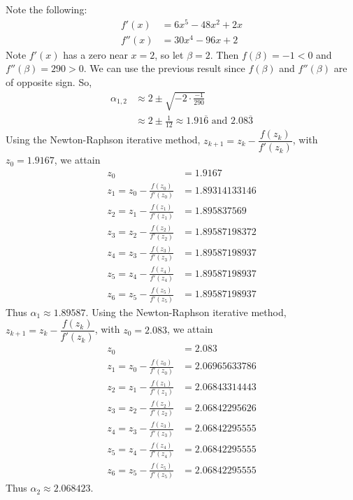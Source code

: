 \documentclass[12pt]{article}
\begin{document}
\noindent Note the following:
\begin{align*}
f'(x) &= 6x^5 - 48x^2 + 2x \\
f''(x) &= 30x^4 - 96x + 2
\end{align*}
Note $f'(x)$ has a zero near $x = 2$, so let $\beta = 2$.  Then $f(\beta) = -1< 0$ and $f''(\beta) = 290 > 0$.  We can use the previous result since $f(\beta)$ and $f''(\beta)$ are of opposite sign.  So,
\begin{align*}
\alpha_{1,2} &\approx 2 \pm \sqrt{-2\cdot \frac{-1}{290}} \\
&\approx 2 \pm \frac{1}{12} \approx 1.91\overline{6} \text{ and } 2.08\overline{3}\end{align*}
Using the Newton-Raphson iterative method, $z_{k+1} = z_k - \dfrac{f(z_k)}{f'(z_k)}$, with $z_0 = 1.9167$, we attain
\begin{align*}
z_0 &= 1.9167 \\
z_1 = z_0 - \frac{f(z_0)}{f'(z_0)} &= 1.89314133146 \\
z_2 = z_1 - \frac{f(z_1)}{f'(z_1)} &=  1.895837569 \\
z_3 = z_2 - \frac{f(z_2)}{f'(z_2)} &=  1.89587198372 \\
z_4 = z_3 - \frac{f(z_3)}{f'(z_3)} &=  1.89587198937 \\
z_5 = z_4 - \frac{f(z_4)}{f'(z_4)} &=  1.89587198937 \\
z_6 = z_5 - \frac{f(z_5)}{f'(z_5)} &=  1.89587198937
\end{align*}
Thus $\alpha_1 \approx 1.89587$.  Using the Newton-Raphson iterative method, $z_{k+1} = z_k - \dfrac{f(z_k)}{f'(z_k)}$, with $z_0 = 2.083$, we attain
\begin{align*}
z_0 &= 2.083 \\
z_1 = z_0 - \frac{f(z_0)}{f'(z_0)} &= 2.06965633786 \\
z_2 = z_1 - \frac{f(z_1)}{f'(z_1)} &=  2.06843314443 \\
z_3 = z_2 - \frac{f(z_2)}{f'(z_2)} &=  2.06842295626 \\
z_4 = z_3 - \frac{f(z_3)}{f'(z_3)} &=  2.06842295555 \\
z_5 = z_4 - \frac{f(z_4)}{f'(z_4)} &=  2.06842295555 \\
z_6 = z_5 - \frac{f(z_5)}{f'(z_5)} &=  2.06842295555
\end{align*}
Thus $\alpha_2 \approx 2.068423$.
\end{document}
